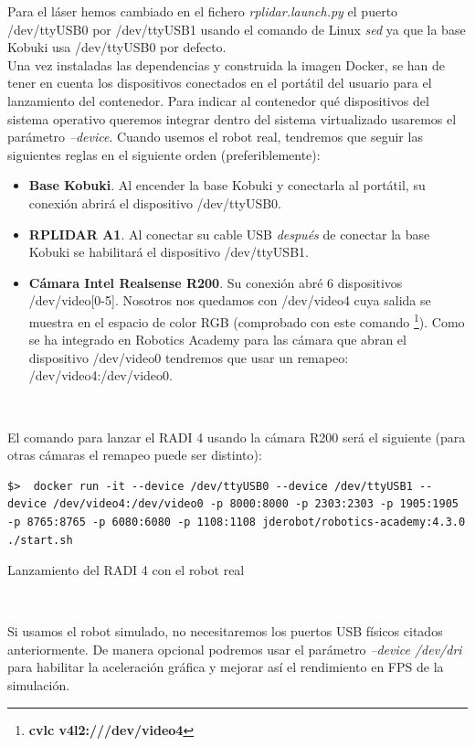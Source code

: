 Para el láser hemos cambiado en el fichero \textit{rplidar.launch.py} el puerto /dev/ttyUSB0 por /dev/ttyUSB1 usando el comando de Linux \textit{sed} ya que la base Kobuki usa /dev/ttyUSB0 por defecto.\\

Una vez instaladas las dependencias y construida la imagen Docker, se han de tener en cuenta los dispositivos conectados en el portátil del usuario para el lanzamiento del contenedor. Para indicar al contenedor qué dispositivos del sistema operativo queremos integrar dentro del sistema virtualizado usaremos el parámetro \textit{--device}. Cuando usemos el robot real, tendremos que seguir las siguientes reglas en el siguiente orden (preferiblemente):\\

\begin{itemize}
	\item \textbf{Base Kobuki}. Al encender la base Kobuki y conectarla al portátil, su conexión abrirá el dispositivo /dev/ttyUSB0.
	\item \textbf{RPLIDAR A1}. Al conectar su cable USB \textit{después} de conectar la base Kobuki se habilitará el dispositivo /dev/ttyUSB1.
	\item \textbf{Cámara Intel Realsense R200}. Su conexión abré 6 dispositivos /dev/video[0-5]. Nosotros nos quedamos con /dev/video4 cuya salida se muestra en el espacio de color RGB (comprobado con este comando \footnote{\textbf{cvlc v4l2:///dev/video4}}). Como se ha integrado en Robotics Academy para las cámara que abran el dispositivo /dev/video0 tendremos que usar un remapeo: /dev/video4:/dev/video0.
\end{itemize}\

El comando para lanzar el RADI 4 usando la cámara R200 será el siguiente (para otras cámaras el remapeo puede ser distinto):\\

\begin{code}[H]
\begin{lstlisting}
$>  docker run -it --device /dev/ttyUSB0 --device /dev/ttyUSB1 --device /dev/video4:/dev/video0 -p 8000:8000 -p 2303:2303 -p 1905:1905 -p 8765:8765 -p 6080:6080 -p 1108:1108 jderobot/robotics-academy:4.3.0 ./start.sh
\end{lstlisting}
\caption{Lanzamiento del RADI 4 con el robot real}
\label{cod:lanzamiento_radi_robot_real}
\end{code}\

Si usamos el robot simulado, no necesitaremos los puertos USB físicos citados anteriormente. De manera opcional podremos usar el parámetro \textit{--device /dev/dri} para habilitar la aceleración gráfica y mejorar así el rendimiento en FPS de la simulación.\\

